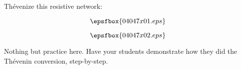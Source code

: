 

Th\'evenize this resistive network:

$$\epsfbox{04047x01.eps}$$







$$\epsfbox{04047x02.eps}$$







Nothing but practice here.  Have your students demonstrate how they did the Th\'evenin conversion, step-by-step.




